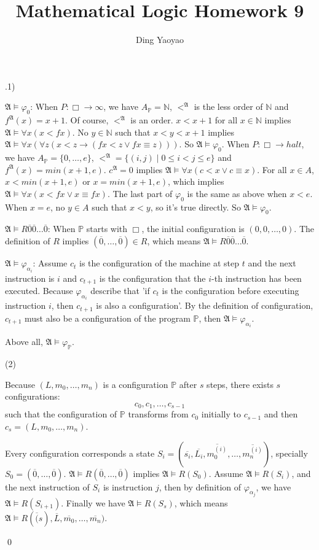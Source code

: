 \documentclass[10pt,a4paper]{article}
\author{Ding Yaoyao}
\title{Mathematical Logic Homework 9}
\newenvironment{sol}[1]
{\par\vspace{3mm}\noindent{\it Solution #1}.}
{\qed}
\newcommand{\fA}{\mathfrak{A}}
\begin{document}
	\maketitle
	
	\begin{sol}{9.1}
		
		(1)
		
		$\fA\models\varphi_0$: When $P:\Box\rightarrow\infty$, we have $A_{\mathbb{P}} = \mathbb{N}$, $<^{\fA}$ is the less order of $\mathbb{N}$ and $f^{\fA}(x) = x + 1$. Of course, $<^{\fA}$ is an order. $x < x + 1$ for all $x \in \mathbb{N}$ implies $\fA \models \forall x(x < fx)$. No $y \in \mathbb{N}$ such that $x < y < x + 1$ implies $\fA \models \forall x(\forall z(x < z \rightarrow (fx<z \vee fx\equiv z)))$. So $\fA \models \varphi_0$. When $P:\Box\rightarrow halt$, we have $A_{\mathbb{P}} = \{0, \dots, e\}$, $<^{\fA} = \{(i,j) \mid 0 \leq i < j \leq e\}$ and $f^{\fA}(x) = min(x + 1, e)$. $c^\fA = 0$ implies $\fA \models \forall x(c < x \vee c \equiv x)$. For all $x \in A$, $x < min(x+1,e)$ or $x = min(x+1,e)$, which implies $\fA \models \forall x(x < fx \vee x \equiv fx)$. The last part of $\varphi_0$ is the same as above when $x < e$. When $x = e$, no $y \in A$ such that $x < y$, so it's true directly. So $\fA \models \varphi_0$.
		
		$\fA\models R\overline{0}\overline{0}\dots\overline{0}$: When $\mathbb{P}$ starts with $\Box$, the initial configuration is $(0,0,\dots,0)$. The definition of $R$ implies $(\overline{0},\dots,\overline{0}) \in R$, which means $\fA\models R\overline{0}\overline{0}\dots\overline{0}$.
		
		$\fA\models \varphi_{\alpha_i}$: Assume $c_t$ is the configuration of the machine at step $t$ and the next instruction is $i$ and $c_{t+1}$ is the configuration that the $i$-th instruction has been executed. Because $\varphi_{\alpha_i}$ describe that 'if $c_t$ is the configuration before executing instruction $i$, then $c_{t+1}$ is also a configuration'. By the definition of configuration, $c_{t+1}$ must also be a configuration of the program $\mathbb{P}$, then $\fA \models \varphi_{\alpha_i}$.
		
		Above all, $\fA \models \varphi_{\mathbb{P}}$.
		
		(2)
		
		Because $(L,m_0,\dots,m_n)$ is a configuration $\mathbb{P}$ after $s$ steps, there exists $s$ configurations:
		$$
			c_0, c_1, \dots, c_{s-1}
		$$
		such that the configuration of $\mathbb{P}$ transforms from $c_0$ initially to $c_{s-1}$ and then $c_s = (L,m_0,\dots,m_n)$.
		
		Every configuration corresponds a state $S_i = (\overline{s_i},\overline{L_i},\overline{m^{(i)}_0},\dots,\overline{m^{(i)}_n})$, specially $S_0 = (\overline{0}, \dots, \overline{0})$. $\fA\models R(\overline{0},\dots,\overline{0})$ implies $\fA \models R(S_0)$. Assume $\fA \models R(S_i)$, and the next instruction of $S_i$ is instruction $j$, then by definition of $\varphi_{\alpha_{j}}$, we have $\fA \models R(S_{i+1})$. Finally we have $\fA \models R(S_s)$, which means $\fA \models R(\overline(s), \overline{L}, \overline{m_0}, \dots, \overline{m_n})$.
		
	\end{sol}
\end{document}
